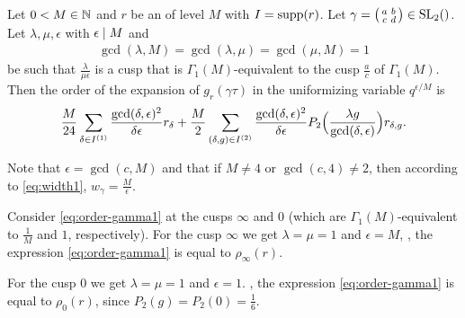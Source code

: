 \documentclass{article}
\begin{document}
\begin{AdditionalInformation}
\begin{Lemma}
  \label{thm:matrixEtaOrderRobins}
  \cite[Thm~4]{Robins_GeneralizedDedekindEtaProducts_1994}
  Let $0<M\in\mathbb{N}$ and $r$ be an  of level
  $M$ with $I = \operatorname{supp}(r)$.
  Let
  $\gamma=\left(\begin{smallmatrix}a&b\\c&d\end{smallmatrix}\right)\in\SL2Z$.
  Let
  $\lambda,\mu,\epsilon$ with $\epsilon \mid M$ and
  \begin{gather}
    \gcd(\lambda,M)=\gcd(\lambda,\mu)=\gcd(\mu,M)=1
  \end{gather}
  be such that
  $\frac{\lambda}{\mu\epsilon}$ is a cusp that is
  $\Gamma_1(M)$-equivalent to the cusp $\frac{a}{c}$ of $\Gamma_1(M)$.
  Then the order of the expansion of $g_r(\gamma\tau)$ in the
  uniformizing variable $q^{\epsilon/M}$ is
  \begin{gather}
    \frac{M}{24} \sum_{\delta\in I^{(1)}}
    \frac{\gcd(\delta,\epsilon)^2}{\delta\epsilon} r_\delta +
    \frac{M}{2} \sum_{(\delta,g)\in I^{(2)}}
    \frac{\gcd(\delta,\epsilon)^2}{\delta\epsilon} P_2\Bigl(\frac{\lambda
      g}{\gcd(\delta,\epsilon)}\Bigr) r_{\delta,g}.
    \label{eq:order-gamma1}
  \end{gather}
\end{Lemma}

Note that $\epsilon = \gcd(c, M)$ and that if $M\ne4$ or
$\gcd(c,4)\ne2$, then according to \eqref{eq:width1},
$w_\gamma=\frac{M}{\epsilon}$.

Consider \eqref{eq:order-gamma1} at the cusps $\infty$ and
$0$ (which are $\Gamma_1(M)$-equivalent to $\frac{1}{M}$ and $1$,
respectively).
%
For the cusp $\infty$ we get $\lambda=\mu=1$ and $\epsilon=M$, \ie,
the expression \eqref{eq:order-gamma1} is equal to $\rho_\infty(r)$.

For the cusp $0$ we get $\lambda=\mu=1$ and $\epsilon=1$. \ie, the
expression \eqref{eq:order-gamma1} is equal to $\rho_0(r)$, since
$P_2(g)=P_2(0)=\frac{1}{6}$.

\end{AdditionalInformation}
\end{document}
